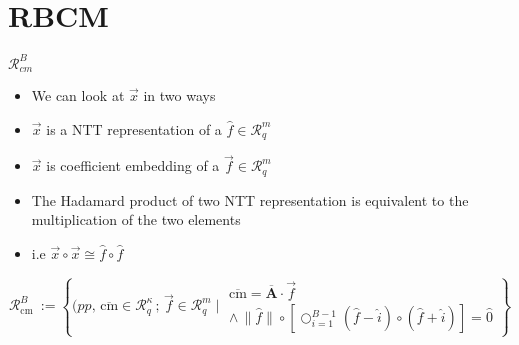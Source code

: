 \section{RBCM}
\begin{frame}{$\mathcal{R}^{B}_{cm}$ }
    \begin{itemize}
        \item We can look at $\overrightarrow{x}$ in two ways
        \item $\overrightarrow{x}$ is a NTT representation of a $\hat{f} \in \mathcal{R}^m_q$
        \item  $\overrightarrow{x}$ is coefficient embedding of a $\overrightarrow{f} \in \mathcal{R}^m_q$
        \item The Hadamard product of two NTT representation is equivalent to the multiplication of the two elements
        \item i.e $\overrightarrow{x} \circ \overrightarrow{x} \cong \hat{f} \circ \hat{f}$
    \end{itemize}
    \[
        \mathcal{R}^B_{\text{cm }} :=
        \left\{ (pp, \, \overline{\text{cm}} \in \mathcal{R}^{\kappa}_q\, ;\, \overrightarrow{f}  \in \mathcal{R}^{m}_q \mid
        \begin{array}{c}
            \overline{\text{cm}} = \overline{\mathbf{A}} \cdot \overrightarrow{f} \\
            \land \, \| \hat{f} \| \circ \left[\bigcirc^{B-1}_{i=1} (\hat{f} - \hat{i}) \circ (\hat{f} + \hat{i}) \right] = \hat{0}
        \end{array}
        \right\}
    \]
\end{frame}